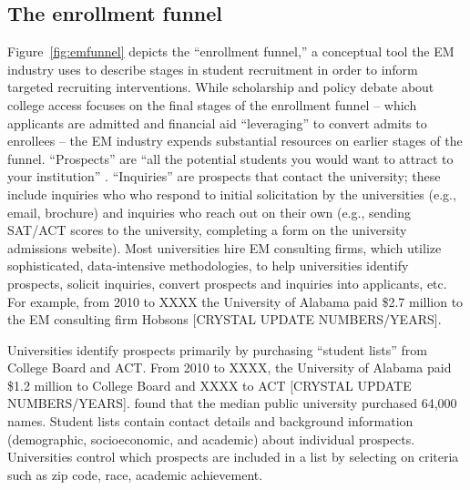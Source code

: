 \documentclass[twoside]{article}
\begin{document}
\subsection*{The enrollment funnel}

Figure~\ref{fig:emfunnel} depicts the ``enrollment funnel,'' a conceptual tool the EM industry uses to describe stages in student recruitment in order to inform targeted recruiting interventions.  While scholarship and policy debate about college access focuses on the final stages of the enrollment funnel -- which applicants are admitted \citep[e.g., ][]{RN3536} and financial aid ``leveraging'' to convert admits to enrollees \citep[e.g., ][]{RN1948} -- the EM industry expends substantial resources on earlier stages of the funnel.  ``Prospects'' are ``all the potential students you would want to attract to your institution'' \citep{RN4322}. ``Inquiries'' are prospects that contact the university; these include inquiries who who respond to initial solicitation by the universities (e.g., email, brochure) and inquiries who reach out on their own (e.g., sending SAT/ACT scores to the university, completing a form on the university admissions website).  Most universities hire EM consulting firms, which utilize sophisticated, data-intensive methodologies, to help universities identify prospects, solicit inquiries, convert prospects and inquiries into applicants, etc. For example, from 2010 to XXXX the University of Alabama paid \$2.7 million to the EM consulting firm Hobsons \citep{RN4035}[CRYSTAL UPDATE NUMBERS/YEARS].






Universities identify prospects primarily by purchasing ``student lists'' from College Board and ACT. From 2010 to XXXX, the University of Alabama paid \$1.2 million to College Board and XXXX to ACT \citep{RN4035} [CRYSTAL UPDATE NUMBERS/YEARS].  \cite{RN4314} found that the median public university purchased 64,000 names. Student lists contain contact details and background information (demographic, socioeconomic, and academic) about individual prospects. Universities control which prospects are included in a list by selecting on criteria such as zip code, race, academic achievement.  
\end{document}
